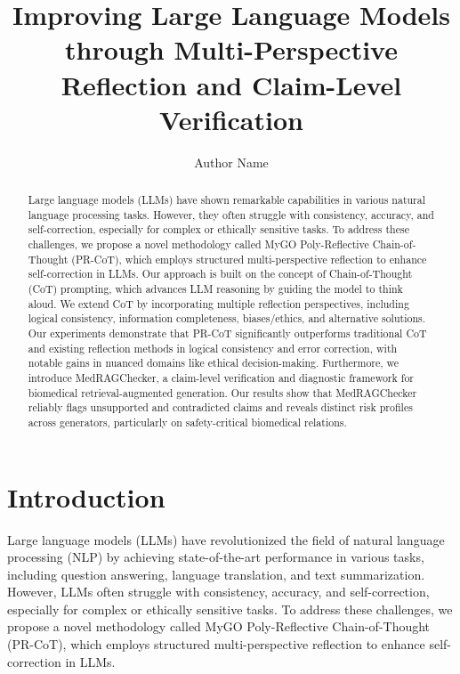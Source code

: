 \documentclass{article}
\begin{document}
\title{Improving Large Language Models through Multi-Perspective Reflection and Claim-Level Verification}

\author{Author Name}

\maketitle

\begin{abstract}
Large language models (LLMs) have shown remarkable capabilities in various natural language processing tasks. However, they often struggle with consistency, accuracy, and self-correction, especially for complex or ethically sensitive tasks. To address these challenges, we propose a novel methodology called MyGO Poly-Reflective Chain-of-Thought (PR-CoT), which employs structured multi-perspective reflection to enhance self-correction in LLMs. Our approach is built on the concept of Chain-of-Thought (CoT) prompting, which advances LLM reasoning by guiding the model to think aloud. We extend CoT by incorporating multiple reflection perspectives, including logical consistency, information completeness, biases/ethics, and alternative solutions. Our experiments demonstrate that PR-CoT significantly outperforms traditional CoT and existing reflection methods in logical consistency and error correction, with notable gains in nuanced domains like ethical decision-making. Furthermore, we introduce MedRAGChecker, a claim-level verification and diagnostic framework for biomedical retrieval-augmented generation. Our results show that MedRAGChecker reliably flags unsupported and contradicted claims and reveals distinct risk profiles across generators, particularly on safety-critical biomedical relations.
\end{abstract}

\section{Introduction}

Large language models (LLMs) have revolutionized the field of natural language processing (NLP) by achieving state-of-the-art performance in various tasks, including question answering, language translation, and text summarization. However, LLMs often struggle with consistency, accuracy, and self-correction, especially for complex or ethically sensitive tasks. To address these challenges, we propose a novel methodology called MyGO Poly-Reflective Chain-of-Thought (PR-CoT), which employs structured multi-perspective reflection to enhance self-correction in LLMs.
\end{document}
